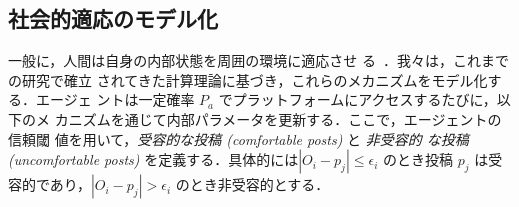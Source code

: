 \documentclass[a4j]{ujarticle}
\def\BoundedConfidence{\epsilon}
\begin{document}



\subsection{社会的適応のモデル化}
一般に，人間は自身の内部状態を周囲の環境に適応させ
る~\cite{NoelleNeumann1974,Cialdini2004}．我々は，これまでの研究で確立
されてきた計算理論に基づき，これらのメカニズムをモデル化する．エージェ
ントは一定確率 $P_a$ でプラットフォームにアクセスするたびに，以下のメ
カニズムを通じて内部パラメータを更新する．ここで，エージェントの信頼閾
値を用いて，\emph{受容的な投稿 (comfortable posts)} と \emph{非受容的
  な投稿 (uncomfortable posts)} を定義する．具体的には$|O_i - p_j|
\leq \BoundedConfidence_i$ のとき投稿 $p_j$ は受容的であり，$|O_i -
p_j| > \BoundedConfidence_i$ のとき非受容的とする．
\end{document}
